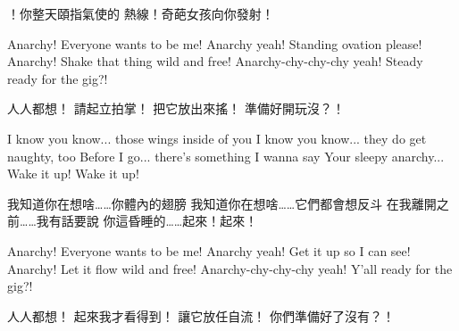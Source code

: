 \begin{paracol}{2}
        \switchcolumn
        ！你整天頤指氣使的
        熱線！奇葩女孩向你發射！

        \vspace{3em}
        \switchcolumn*

        Anarchy! Everyone wants to be me!
        Anarchy yeah! Standing ovation please!
        Anarchy! Shake that thing wild and free!
        Anarchy-chy-chy-chy yeah! Steady ready for the gig?!

        \vspace{3em}

        \switchcolumn
        人人都想！
        請起立拍掌！
        把它放出來搖！
        準備好開玩沒？！


        \vspace{3em}
        \switchcolumn*

        I know you know... those wings inside of you
        I know you know... they do get naughty, too
        Before I go... there's something I wanna say
        Your sleepy anarchy... Wake it up! Wake it up!

        \vspace{3em}


        \switchcolumn
        我知道你在想啥……你體內的翅膀
        我知道你在想啥……它們都會想反斗
        在我離開之前……我有話要說
        你這昏睡的……起來！起來！

        \vspace{3em}
        \switchcolumn*

        Anarchy! Everyone wants to be me!
        Anarchy yeah! Get it up so I can see!
        Anarchy! Let it flow wild and free!
        Anarchy-chy-chy-chy yeah! Y'all ready for the gig?!

        \switchcolumn
        人人都想！
        起來我才看得到！
        讓它放任自流！
        你們準備好了沒有？！

    \egroup

\end{paracol}

\theendnotes

